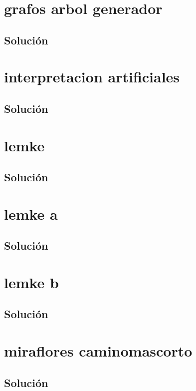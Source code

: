 \section{grafos arbol generador}

\subsection*{Solución}

\clearpage
\section{interpretacion artificiales}

\subsection*{Solución}

\clearpage
\section{lemke}

\subsection*{Solución}

\clearpage
\section{lemke a}

\subsection*{Solución}

\clearpage
\section{lemke b}

\subsection*{Solución}

\clearpage
\section{miraflores caminomascorto}

\subsection*{Solución}

\clearpage
